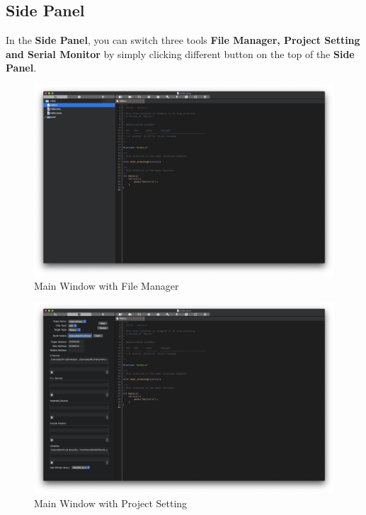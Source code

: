 \documentclass{article}
\begin{document}
		\subsection{Side Panel}
		In the \textbf{Side Panel}, you can switch three tools \textbf{File Manager, Project Setting and Serial Monitor} by simply clicking different button on the top of the \textbf{Side Panel}.
		
			\begin{figure}[h]
				\centering
				\includegraphics[width=.7\textwidth]{MainWindow1}
				\caption{Main Window with File Manager}
			\end{figure}
		
		\newpage
			\begin{figure}[h]
				\centering
				\includegraphics[width=.7\textwidth]{MainWindow2}
				\caption{Main Window with Project Setting}
			\end{figure}
		
\end{document}
